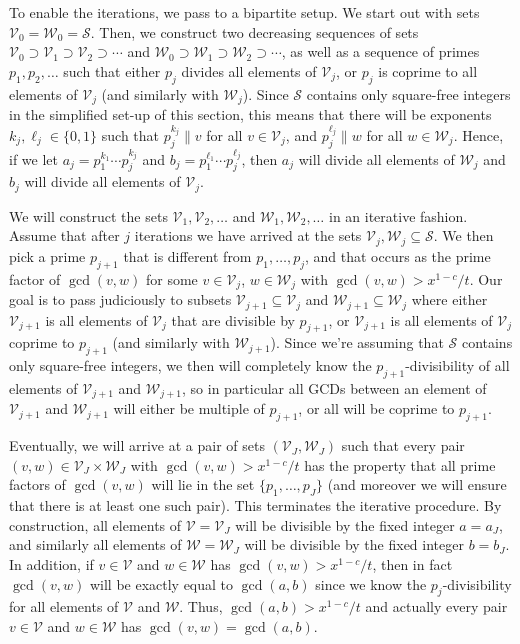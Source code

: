 \documentclass[12pt]{amsart}
\numberwithin{equation}{section}
\theoremstyle{definition}
\theoremstyle{remark}
\newcommand{\CS}{\mathcal{S}}
\newcommand{\CV}{\mathcal{V}}
\newcommand{\CW}{\mathcal{W}}
\begin{document}
To enable the iterations, we pass to a bipartite setup. We start out with sets $\CV_0=\CW_0=\CS$. Then, we construct two decreasing sequences of sets $\CV_0\supset \CV_1\supset\CV_2\supset \cdots$ and $\CW_0\supset\CW_1\supset\CW_2\supset \cdots$, as well as a sequence of primes $p_1,p_2,\dots$ such that either $p_j$ divides all elements of $\CV_j$, or $p_j$ is coprime to all elements of $\CV_j$ (and similarly with $\CW_j$). Since $\CS$ contains only square-free integers in the simplified set-up of this section, this means that there will be exponents $k_j,\ell_j\in\{0,1\}$ such that  $p_j^{k_j}\|v$ for all $v\in\CV_j$, and $p_j^{\ell_j}\|w$ for all $w\in\CW_j$. Hence, if we let $a_j=p_1^{k_1}\cdots p_j^{k_j}$ and $b_j=p_1^{\ell_1}\cdots p_j^{\ell_j}$, then $a_j$ will divide all elements of $\CW_j$ and $b_j$ will divide all elements of $\CV_j$.

We will construct the sets $\CV_1,\CV_2,\dots$ and $\CW_1,\CW_2,\dots$ in an iterative fashion. Assume that after $j$ iterations we have arrived at the sets $\CV_j,\CW_j\subseteq\CS$. We then pick a prime $p_{j+1}$ that is different from $p_1,\dots,p_j$, and that occurs as the prime factor of $\gcd(v,w)$ for some $v\in\CV_j$, $w\in\CW_j$ with $\gcd(v,w)>x^{1-c}/t$. Our goal is to pass judiciously to subsets $\CV_{j+1}\subseteq\CV_j$ and $\CW_{j+1}\subseteq\CW_j$ where either $\CV_{j+1}$ is all elements of $\CV_j$ that are divisible by $p_{j+1}$, or $\CV_{j+1}$ is all elements of $\CV_j$ coprime to $p_{j+1}$ (and similarly with $\CW_{j+1}$). Since we're assuming that $\CS$ contains only square-free integers, we then will completely know the $p_{j+1}$-divisibility of all elements of $\CV_{j+1}$ and $\CW_{j+1}$, so in particular all GCDs between an element of $\CV_{j+1}$ and $\CW_{j+1}$ will either be multiple of $p_{j+1}$, or all will be coprime to $p_{j+1}$.

Eventually, we will arrive at a pair of sets $(\CV_J,\CW_J)$ such that every pair $(v,w)\in\CV_J\times\CW_J$ with $\gcd(v,w)>x^{1-c}/t$ has the property that all prime factors of $\gcd(v,w)$ will lie in the set $\{p_1,\dots,p_J\}$ (and moreover we will ensure that there is at least one such pair). This terminates the iterative procedure. By construction, all elements of $\CV=\CV_J$ will be divisible by the fixed integer $a=a_J$, and similarly all elements of $\CW=\CW_J$ will be divisible by the fixed integer $b=b_J$. In addition, if $v\in\CV$ and $w\in\CW$ has $\gcd(v,w)>x^{1-c}/t$, then in fact $\gcd(v,w)$ will be exactly equal to $\gcd(a,b)$ since we know the $p_j$-divisibility for all elements of $\CV$ and $\CW$. Thus, $\gcd(a,b)>x^{1-c}/t$ and actually every pair $v\in \CV$ and $w\in\CW$ has $\gcd(v,w)=\gcd(a,b)$. 
\end{document}
